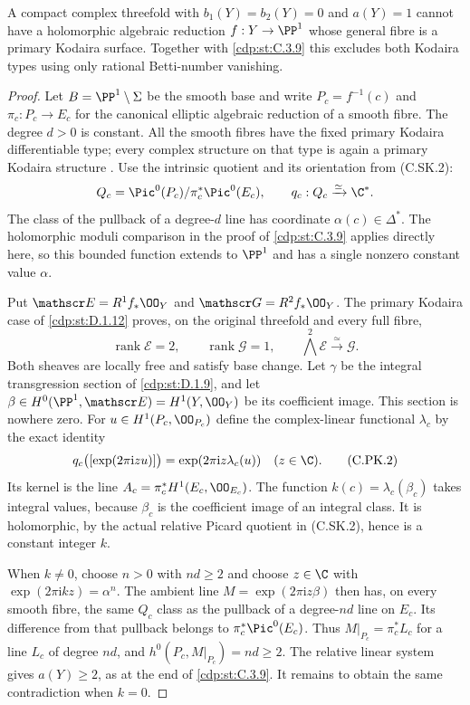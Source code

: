 
\begin{proposition}\label{cdp:st:C.3.10}

A compact complex threefold with $b_1(Y)=b_2(Y)=0$ and
$a(Y)=1$ cannot have a holomorphic algebraic reduction
$f:Y\to\PP^1$ whose general fibre is a primary Kodaira
surface. Together with \ref{cdp:st:C.3.9} this excludes both Kodaira
types using only rational Betti-number vanishing.
\end{proposition}
\begin{proof}
Let $B=\PP^1\setminus\Sigma$ be the smooth base and write
$P_c=f^{-1}(c)$ and $\pi_c:P_c\to E_c$ for the canonical
elliptic algebraic reduction of a smooth fibre. The degree
$d>0$ is constant. All the smooth fibres have the fixed
primary Kodaira differentiable type; every complex structure
on that type is again a primary Kodaira structure
\cite[pp.~373--374]{Borcea1984}.
Use the intrinsic quotient and its orientation from (C.SK.2):
\[
 Q_c=\Pic^0(P_c)/\pi_c^*\Pic^0(E_c),\qquad
 q_c:Q_c\xrightarrow{\simeq}\C^*.
\]
The class of the pullback of a degree-$d$ line has coordinate
$\alpha(c)\in\Delta^*$. The holomorphic moduli comparison
in the proof of \ref{cdp:st:C.3.9} applies directly here, so this bounded
function extends to $\PP^1$ and has a single nonzero
constant value $\alpha$.

Put $\mathscr E=R^1f_*\OO_Y$ and
$\mathscr G=R^2f_*\OO_Y$. The primary Kodaira case of
\ref{cdp:st:D.1.12} proves, on the original threefold and every full fibre,
\[
 \operatorname{rank}\mathscr E=2,\qquad
 \operatorname{rank}\mathscr G=1,\qquad
 \bigwedge^2\mathscr E\xrightarrow{\simeq}\mathscr G.
\tag{C.PK.1}\label{cdp:eq:C.PK.1}
\]
Both sheaves are locally free and satisfy base change.
Let $\gamma$ be the integral transgression section of \ref{cdp:st:D.1.9},
and let $\beta\in H^0(\PP^1,\mathscr E)=H^1(Y,\OO_Y)$
be its coefficient image. This section is nowhere zero.
For $u\in H^1(P_c,\OO_{P_c})$ define the complex-linear
functional $\lambda_c$ by the exact identity
\[
 q_c\bigl([\exp(2\pi\mathrm i z u)]\bigr)
     =\exp(2\pi\mathrm i z\lambda_c(u))
     \quad(z\in\C).
\tag{C.PK.2}\label{cdp:eq:C.PK.2}
\]
Its kernel is the line
$A_c=\pi_c^*H^1(E_c,\OO_{E_c})$.
The function $k(c)=\lambda_c(\beta_c)$ takes integral
values, because $\beta_c$ is the coefficient image of
an integral class. It is holomorphic, by the actual relative
Picard quotient in (C.SK.2), hence is a constant integer $k$.

When $k\ne0$, choose $n>0$ with $nd\ge2$ and choose
$z\in\C$ with $\exp(2\pi\mathrm i kz)=\alpha^n$.
The ambient line $M=\exp(2\pi\mathrm i z\beta)$ then
has, on every smooth fibre, the same $Q_c$ class as the
pullback of a degree-$nd$ line on $E_c$. Its difference
from that pullback belongs to $\pi_c^*\Pic^0(E_c)$.
Thus
$M|_{P_c}=\pi_c^*L_c$ for a line $L_c$ of degree $nd$,
and $h^0(P_c,M|_{P_c})=nd\ge2$. The relative linear
system gives $a(Y)\ge2$, as at the end of \ref{cdp:st:C.3.9}.
It remains to obtain the same contradiction when $k=0$.


\end{proof}
